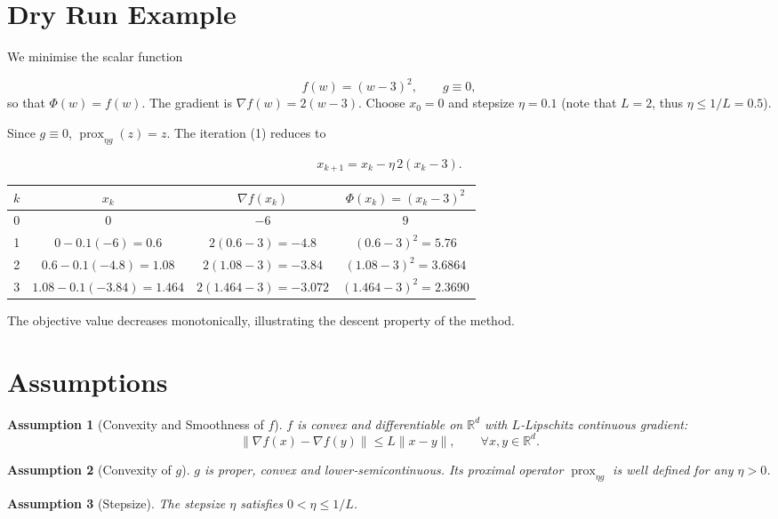 \documentclass{article}
\newtheorem{assumption}{Assumption}
\newcommand{\prox}{\operatorname{prox}}
\newcommand{\R}{\mathbb{R}}
\begin{document}
\section*{Dry Run Example}
We minimise the scalar function  

\[
f(w)=(w-3)^{2},\qquad g\equiv0,
\]
so that $\Phi(w)=f(w)$.  
The gradient is $\nabla f(w)=2(w-3)$.  
Choose $x_{0}=0$ and stepsize $\eta=0.1$ (note that $L=2$, thus $\eta\le1/L=0.5$).

Since $g\equiv0$, $\prox_{\eta g}(z)=z$.  The iteration (1) reduces to  

\[
x_{k+1}=x_{k}-\eta\,2(x_{k}-3).
\]

\begin{center}
\begin{tabular}{c|c|c|c}
$k$ & $x_{k}$ & $\nabla f(x_{k})$ & $\Phi(x_{k})=(x_{k}-3)^{2}$\\\hline
0 & $0$ & $-6$ & $9$\\
1 & $0-0.1(-6)=0.6$ & $2(0.6-3)=-4.8$ & $(0.6-3)^{2}=5.76$\\
2 & $0.6-0.1(-4.8)=1.08$ & $2(1.08-3)=-3.84$ & $(1.08-3)^{2}=3.6864$\\
3 & $1.08-0.1(-3.84)=1.464$ & $2(1.464-3)=-3.072$ & $(1.464-3)^{2}=2.3690$
\end{tabular}
\end{center}
The objective value decreases monotonically, illustrating the descent property of the method.

\newpage
\section*{Assumptions}
\begin{assumption}[Convexity and Smoothness of $f$]\label{ass:f}
$f$ is convex and differentiable on $\R^{d}$ with $L$‑Lipschitz continuous gradient:
\[
\|\nabla f(x)-\nabla f(y)\|\le L\|x-y\|,\qquad\forall x,y\in\R^{d}.
\]
\end{assumption}
\begin{assumption}[Convexity of $g$]\label{ass:g}
$g$ is proper, convex and lower‑semicontinuous. Its proximal operator $\prox_{\eta g}$ is well defined for any $\eta>0$.
\end{assumption}
\begin{assumption}[Stepsize]\label{ass:step}
The stepsize $\eta$ satisfies $0<\eta\le 1/L$.
\end{assumption}
\end{document}
